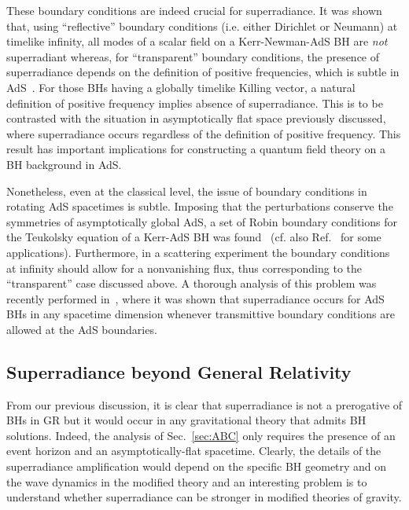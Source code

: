 \documentclass[11pt]{article}
\numberwithin{equation}{section} %
\begin{document}
These boundary conditions are indeed crucial for superradiance. It was shown that, using ``reflective'' boundary conditions (i.e. either Dirichlet or Neumann) at timelike infinity, all modes of a scalar field on a Kerr-Newman-AdS BH are \emph{not} superradiant whereas, for ``transparent'' boundary conditions, the presence of superradiance depends on the definition of positive frequencies, which is subtle in AdS~\cite{Winstanley:2001nx}.
For those BHs having a globally timelike Killing vector, a natural definition of positive frequency implies absence of superradiance. This is to be contrasted with the situation  in asymptotically
flat space previously discussed, where superradiance occurs regardless of the definition of positive frequency. This result has important implications for constructing a quantum field theory on a BH background in AdS.

Nonetheless, even at the classical level, the issue of boundary conditions in rotating AdS spacetimes is subtle. Imposing that the perturbations conserve the symmetries of asymptotically global AdS, a set of Robin boundary conditions for the Teukolsky equation of a Kerr-AdS BH was found~\cite{Dias:2013sdc} (cf. also Ref.~\cite{Cardoso:2013pza} for some applications). Furthermore, in a scattering experiment the boundary conditions at infinity should allow for a nonvanishing flux, thus corresponding to the ``transparent'' case discussed above. A thorough analysis of this problem was recently performed in~\cite{Jorge:2014kra}, where it was shown that superradiance occurs for AdS BHs in any spacetime dimension whenever transmittive boundary conditions are allowed at the AdS boundaries.







\subsection{Superradiance beyond General Relativity}
From our previous discussion, it is clear that superradiance is not a prerogative of BHs in GR but it would occur in any gravitational theory that admits BH solutions. Indeed, the analysis of Sec.~\ref{sec:ABC} only requires the presence of an event horizon and an asymptotically-flat spacetime. Clearly, the details of the superradiance amplification would depend on the specific BH geometry and on the wave dynamics in the modified theory and an interesting problem is to understand whether superradiance can be stronger in modified theories of gravity.
\end{document}
